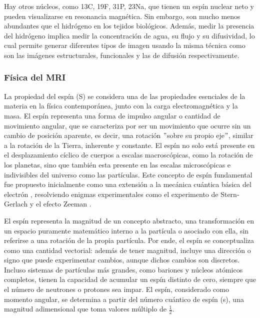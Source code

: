 \documentclass[11pt,letterpaper]{article}
\numberwithin{equation}{subsection}
\numberwithin{table}{subsection}
\begin{document}
\bigskip
\noindent Hay otros núcleos, como 13C, 19F, 31P, 23Na, que tienen un espín nuclear neto y pueden visualizarse en resonancia magnética. Sin embargo, son mucho menos abundantes que el hidrógeno en los tejidos biológicos. Además, medir la presencia del hidrógeno implica medir la concentración de agua, su flujo y su difusividad, lo cual permite generar diferentes tipos de imagen usando la misma técnica como son las imágenes estructurales, funcionales y las de difusión respectivamente.

 
\subsubsection*{Física del MRI}

\smallskip
\noindent La propiedad del espín (S) se considera una de las propiedades esenciales de la materia en la física contemporánea, junto con la carga electromagnética y la masa. El espín representa una forma de impulso angular o cantidad de movimiento angular, que se caracteriza por ser un movimiento que ocurre sin un cambio de posición aparente, es decir, una rotación $"$sobre su propio eje$"$, similar a la rotación de la Tierra, inherente y constante. El espín no solo está presente en el desplazamiento cíclico de cuerpos a escalas macroscópicas, como la rotación de los planetas, sino que también esta presente en las escalas microscópicas e indivisibles del universo como las partículas. Este concepto de espín fundamental fue propuesto inicialmente como una extensión a la mecánica cuántica básica del electrón \cite{pauli1925einfluss, uhlenbeck1925ersetzung, pauli1988quantenmechanik}, resolviendo enigmas experimentales como el experimento de Stern-Gerlach \cite{gerlach1922magnetische} y el efecto Zeeman \cite{preston1899radiation}.

\bigskip
\noindent El espín representa la magnitud de un concepto abstracto, una transformación en un espacio puramente matemático interno a la partícula o asociado con ella, sin referirse a una rotación de la propia partícula. Por ende, el espín se conceptualiza como una cantidad vectorial: además de tener magnitud, incluye una dirección o signo que puede experimentar cambios, aunque dichos cambios son discretos. Incluso sistemas de partículas más grandes, como bariones y núcleos atómicos completos, tienen la capacidad de acumular un espín distinto de cero, siempre que el número de neutrones o protones sea impar. El espín, considerado como momento angular, se determina a partir del número cuántico de espín (s), una magnitud adimensional que toma valores múltiplo de $\frac{1}{2}$. 
\end{document}
